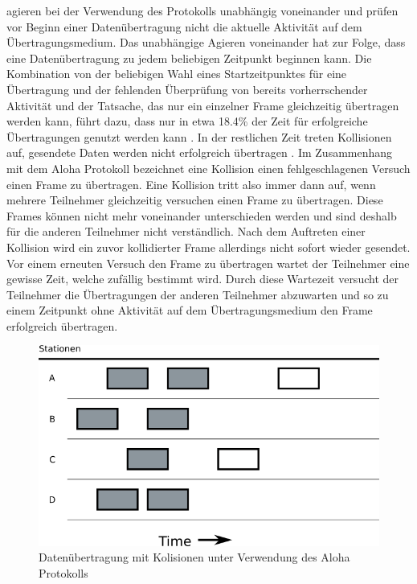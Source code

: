 agieren bei der Verwendung des Protokolls unabhängig voneinander und prüfen vor Beginn einer Datenübertragung nicht die aktuelle Aktivität auf dem Übertragungsmedium. Das unabhängige Agieren voneinander hat zur Folge, dass eine Datenübertragung zu jedem beliebigen Zeitpunkt beginnen kann. Die Kombination von der beliebigen Wahl eines Startzeitpunktes für eine Übertragung und der fehlenden Überprüfung von bereits vorherrschender Aktivität und der Tatsache, das nur ein einzelner Frame gleichzeitig übertragen werden kann, führt dazu, dass nur in etwa 18.4\% der Zeit für erfolgreiche Übertragungen genutzt werden kann \cite{Back_AlohaPure}. In der restlichen Zeit treten Kollisionen auf, gesendete Daten werden nicht erfolgreich übertragen \cite{Back_AlohaPure}. Im Zusammenhang mit dem Aloha Protokoll bezeichnet eine Kollision einen fehlgeschlagenen Versuch einen Frame zu übertragen. Eine Kollision tritt also immer dann auf, wenn mehrere Teilnehmer gleichzeitig versuchen einen Frame zu übertragen. Diese Frames können nicht mehr voneinander unterschieden werden und sind deshalb für die anderen Teilnehmer nicht verständlich. Nach dem Auftreten einer Kollision wird ein zuvor kollidierter Frame allerdings nicht sofort wieder gesendet. Vor einem erneuten Versuch den Frame zu übertragen wartet der Teilnehmer eine gewisse Zeit, welche zufällig bestimmt wird. Durch diese Wartezeit versucht der Teilnehmer die Übertragungen der anderen Teilnehmer abzuwarten und so zu einem Zeitpunkt ohne Aktivität auf dem Übertragungsmedium den Frame erfolgreich übertragen.
\begin{figure}[h!]
	\begin{center}
	\includegraphics[scale=0.6]{img/ZeichnungExport2.png}
	\caption{Datenübertragung mit Kolisionen unter Verwendung des Aloha Protokolls}
	\end{center}
	\label{Abb2_PureAloha}
\end{figure}


